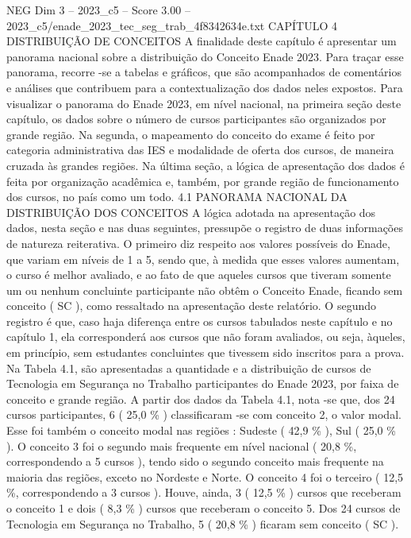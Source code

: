 \begin{textsample}{NEG Dim 3 – 2023\_c5 – Score 3.00 – 2023\_c5/enade\_2023\_tec\_seg\_trab\_4f8342634e.txt}  \label{ex:f3_neg_229}
CAPÍTULO 4 DISTRIBUIÇÃO DE CONCEITOS A finalidade deste capítulo é apresentar um panorama nacional sobre a distribuição do Conceito Enade 2023.
Para traçar esse panorama, recorre -se a tabelas e gráficos, que são acompanhados de comentários e análises que contribuem para a contextualização dos dados neles expostos.
Para visualizar o panorama do Enade 2023, em nível nacional, na primeira seção deste capítulo, os dados sobre o número de cursos participantes são organizados por grande região.
Na segunda, o mapeamento do conceito do exame é feito por categoria administrativa das IES e modalidade de oferta dos cursos, de maneira cruzada às grandes regiões.
Na última seção, a lógica de apresentação dos dados é feita por organização acadêmica e, também, por grande região de funcionamento dos cursos, no país como um todo. 4.1 PANORAMA NACIONAL DA DISTRIBUIÇÃO DOS CONCEITOS A lógica adotada na apresentação dos dados, nesta seção e nas duas seguintes, pressupõe o registro de duas informações de natureza reiterativa.
O primeiro diz respeito aos valores possíveis do Enade, que variam em níveis de 1 a 5, sendo que, à medida que esses valores aumentam, o curso é melhor avaliado, e ao fato de que aqueles cursos que tiveram somente um ou nenhum concluinte participante não obtêm o Conceito Enade, ficando sem conceito ( SC ), como ressaltado na apresentação deste relatório.
O segundo registro é que, caso haja diferença entre os cursos tabulados neste capítulo e no capítulo 1, ela corresponderá aos cursos que não foram avaliados, ou seja, àqueles, em princípio, sem estudantes concluintes que tivessem sido inscritos para a prova.
Na Tabela 4.1, são apresentadas a quantidade e a distribuição de cursos de Tecnologia em Segurança no Trabalho participantes do Enade 2023, por faixa de conceito e grande região.
A partir dos dados da Tabela 4.1, nota -se que, dos 24 cursos participantes, 6 ( 25,0 \% ) classificaram -se com conceito 2, o valor modal.
Esse foi também o conceito modal nas regiões : Sudeste ( 42,9 \% ), Sul ( 25,0 \% ).
O conceito 3 foi o segundo mais frequente em nível nacional ( 20,8 \%, correspondendo a 5 cursos ), tendo sido o segundo conceito mais frequente na maioria das regiões, exceto no Nordeste e Norte.
O conceito 4 foi o terceiro ( 12,5 \%, correspondendo a 3 cursos ).
Houve, ainda, 3 ( 12,5 \% ) cursos que receberam o conceito 1 e dois ( 8,3 \% ) cursos que receberam o conceito 5.
Dos 24 cursos de Tecnologia em Segurança no Trabalho, 5 ( 20,8 \% ) ficaram sem conceito ( SC ).

\end{textsample}
